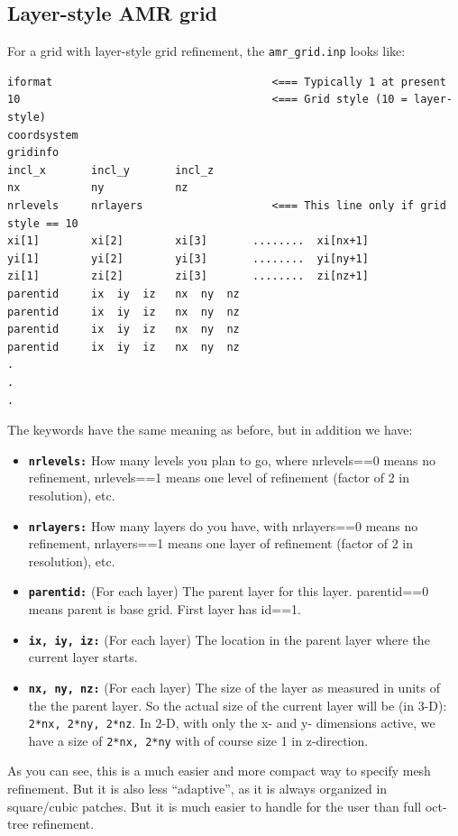\documentclass{report}
\newenvironment{asciibox}%
  {\begin{list}{}{%
    \setlength{\topsep}{0.5em}%
    \setlength{\parskip}{0em}%
    \setlength{\parsep}{0em}%
    \setlength{\itemsep}{0em}%
    \setlength{\rightmargin}{0em}%
    \setlength{\leftmargin}{3.0em}%
    \setlength{\labelsep}{1em}%
    \setlength{\labelwidth}{2em}%
  }\normalfont\footnotesize\item}
  {\end{list}}
\begin{document}
\subsection{Layer-style AMR grid}
\label{sec-amr-grid-layered}
%
For a grid with layer-style grid refinement, the {\small\tt amr\_grid.inp}
looks like:
\begin{asciibox}\begin{verbatim}
iformat                                  <=== Typically 1 at present
10                                       <=== Grid style (10 = layer-style)
coordsystem
gridinfo
incl_x       incl_y       incl_z
nx           ny           nz
nrlevels     nrlayers                    <=== This line only if grid style == 10
xi[1]        xi[2]        xi[3]       ........  xi[nx+1]
yi[1]        yi[2]        yi[3]       ........  yi[ny+1]
zi[1]        zi[2]        zi[3]       ........  zi[nz+1]
parentid     ix  iy  iz   nx  ny  nz     
parentid     ix  iy  iz   nx  ny  nz     
parentid     ix  iy  iz   nx  ny  nz     
parentid     ix  iy  iz   nx  ny  nz     
.
.
.
\end{verbatim}\end{asciibox}
The keywords have the same meaning as before, but in addition we have:
\begin{itemize}
\item[] {\small\tt\bf nrlevels:} How many levels you plan to go, where
  nrlevels==0 means no refinement, nrlevels==1 means one level of refinement
  (factor of 2 in resolution), etc.
\item[] {\small\tt\bf nrlayers:} How many layers do you have, with nrlayers==0
  means no refinement, nrlayers==1 means one layer of refinement (factor of
  2 in resolution), etc.
\item[] {\small\tt\bf parentid:} (For each layer) The parent layer for this
  layer. parentid==0 means parent is base grid. First layer has id==1. 
\item[] {\small\tt\bf ix, iy, iz:} (For each layer) The location in the parent
  layer where the current layer starts.
\item[] {\small\tt\bf nx, ny, nz:} (For each layer) The size of the layer as
  measured in units of the the parent layer. So the actual size of the
  current layer will be (in 3-D): {\small\tt 2*nx, 2*ny, 2*nz}. In 2-D, with
  only the x- and y- dimensions active, we have a size of {\small\tt 2*nx,
    2*ny} with of course size 1 in z-direction.
\end{itemize}
As you can see, this is a much easier and more compact way to specify 
mesh refinement. But it is also less ``adaptive'', as it is always organized
in square/cubic patches. But it is much easier to handle for the user than
full oct-tree refinement. 
\end{document}
